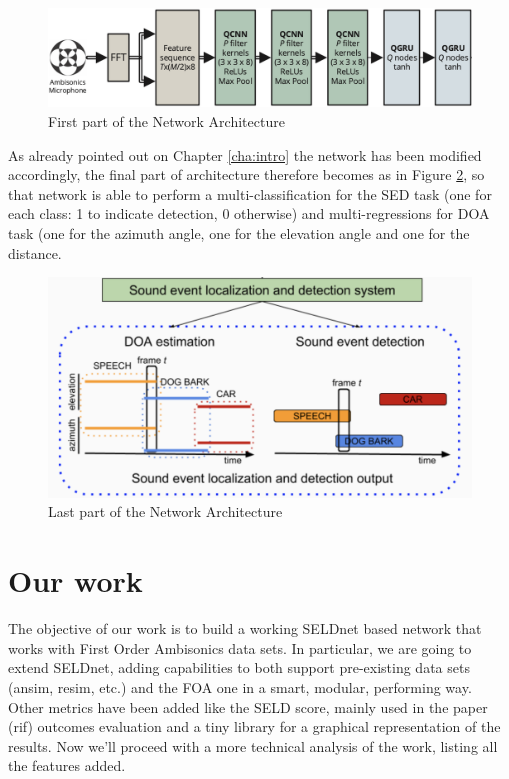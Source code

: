 \documentclass[11pt]{article}
\begin{document}
\begin{figure}[ht]
	\includegraphics[width=\linewidth]{img/arch1.png}
	\caption{First part of the Network Architecture}
	\label{fig:arch1}
\end{figure}

As already pointed out on Chapter \ref{cha:intro} the network has been modified accordingly, the final part of architecture therefore becomes as in Figure \ref{fig:arch2}, so that network is able to perform a multi-classification for the SED task (one for each class: 1 to indicate detection, 0 otherwise) and multi-regressions for DOA task (one for the azimuth angle, one for the elevation angle and one for the distance.

\begin{figure}[ht]
	\centering
	\includegraphics[scale=0.5]{img/arch2.png}
	\caption{Last part of the Network Architecture}
	\label{fig:arch2}
\end{figure}

\newpage
\section{Our work}

The objective of our work is to build a working SELDnet based network that works with First Order Ambisonics data sets. In particular, we are going to extend SELDnet, adding capabilities to both support pre-existing data sets (ansim, resim, etc.) and the FOA one in a smart, modular, performing way. Other metrics have been added like the SELD score, mainly used in the paper (rif) outcomes evaluation and a tiny library for a graphical representation of the results. Now we'll proceed with a more technical analysis of the work, listing all the features added.
\end{document}
